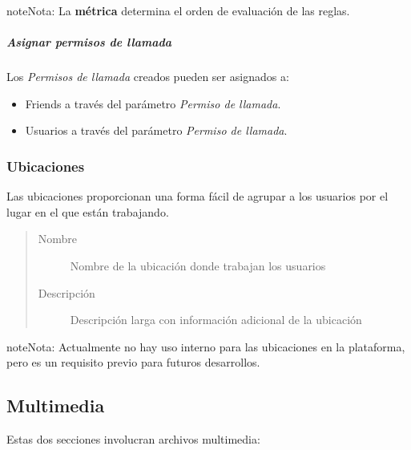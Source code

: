 \documentclass[letterpaper,10pt,spanish]{sphinxmanual}
\begin{document}
\begin{notice}{note}{Nota:}
La \textbf{métrica} determina el orden de evaluación de las reglas.
\end{notice}


\subparagraph{Asignar permisos de llamada}
\label{administration_portal/client/vpbx/user_configuration/call_acls:assign-call-acls}
Los \emph{Permisos de llamada} creados pueden ser asignados a:
\begin{itemize}
\item {} 
Friends a través del parámetro \emph{Permiso de llamada}.

\item {} 
Usuarios a través del parámetro \emph{Permiso de llamada}.

\end{itemize}


\subsubsection{Ubicaciones}
\label{administration_portal/client/vpbx/user_configuration/locations::doc}\label{administration_portal/client/vpbx/user_configuration/locations:locations}
Las ubicaciones proporcionan una forma fácil de agrupar a los usuarios por el lugar en el que están trabajando.
\begin{quote}
\begin{description}
\item[{Nombre}] \leavevmode
Nombre de la ubicación donde trabajan los usuarios

\item[{Descripción}] \leavevmode
Descripción larga con información adicional de la ubicación

\end{description}
\end{quote}

\begin{notice}{note}{Nota:}
Actualmente no hay uso interno para las ubicaciones en la plataforma, pero es un requisito previo para futuros desarrollos.
\end{notice}


\subsection{Multimedia}
\label{administration_portal/client/vpbx/multimedia/index:multimedia}\label{administration_portal/client/vpbx/multimedia/index::doc}
Estas dos secciones involucran archivos multimedia:
\end{document}
